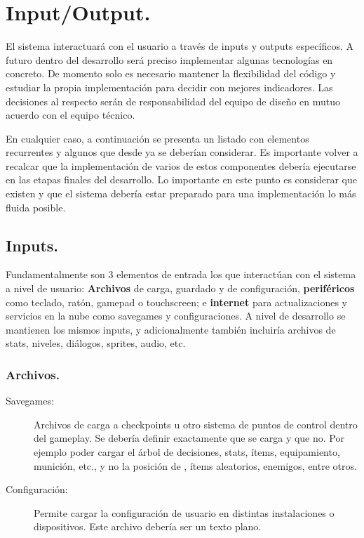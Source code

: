 
\section{Input/Output.}\label{io:input-output}

El sistema interactuará con el usuario a través de inputs y outputs específicos. A futuro dentro del desarrollo será preciso implementar algunas tecnologías en concreto. De momento solo es necesario mantener la flexibilidad del código y estudiar la propia implementación para decidir con mejores indicadores. Las decisiones al respecto serán de responsabilidad del equipo de diseño en mutuo acuerdo con el equipo técnico.

En cualquier caso, a continuación se presenta un listado con elementos recurrentes y algunos que desde ya se deberían considerar. Es importante volver a recalcar que la implementación de varios de estos componentes debería ejecutarse en las etapas finales del desarrollo. Lo importante en este punto es considerar que existen y que el sistema debería estar preparado para una implementación lo más fluida posible.

\subsection{Inputs.}
Fundamentalmente son 3 elementos de entrada los que interactúan con el sistema a nivel de usuario: \textbf{Archivos} de carga, guardado y de configuración, \textbf{periféricos} como teclado, ratón, gamepad o touchscreen; e \textbf{internet} para actualizaciones y servicios en la nube como savegames y configuraciones. A nivel de desarrollo se mantienen los mismos inputs, y adicionalmente también incluiría archivos de stats, niveles, diálogos, sprites, audio, etc.

\subsubsection{Archivos.}

\begin{description}
\item[Savegames:] Archivos de carga a checkpoints u otro sistema de puntos de control dentro del gameplay. Se debería definir exactamente que se carga y que no. Por ejemplo poder cargar el árbol de decisiones, stats, ítems, equipamiento, munición, etc., y no la posición de , ítems aleatorios, enemigos, entre otros.

\item[Configuración:] Permite cargar la configuración de usuario en distintas instalaciones o dispositivos. Este archivo debería ser un texto plano.
\end{description}

